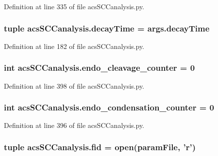 Definition at line 335 of file acs\-S\-C\-Canalysis.\-py.

\hypertarget{a00128_a29728f750a3b57770e836db8409767e9}{
\subsubsection[{decay\-Time}]{\setlength{\rightskip}{0pt plus 5cm}tuple acs\-S\-C\-Canalysis.\-decay\-Time = args.\-decay\-Time}}\label{a00128_a29728f750a3b57770e836db8409767e9}


Definition at line 182 of file acs\-S\-C\-Canalysis.\-py.

\hypertarget{a00128_af5702a39b502da88dde8c38417a0efbd}{
\subsubsection[{endo\-\_\-cleavage\-\_\-counter}]{\setlength{\rightskip}{0pt plus 5cm}int acs\-S\-C\-Canalysis.\-endo\-\_\-cleavage\-\_\-counter = 0}}\label{a00128_af5702a39b502da88dde8c38417a0efbd}


Definition at line 398 of file acs\-S\-C\-Canalysis.\-py.

\hypertarget{a00128_a20a51ec68106a5a97fb3a72f417ca4e6}{
\subsubsection[{endo\-\_\-condensation\-\_\-counter}]{\setlength{\rightskip}{0pt plus 5cm}int acs\-S\-C\-Canalysis.\-endo\-\_\-condensation\-\_\-counter = 0}}\label{a00128_a20a51ec68106a5a97fb3a72f417ca4e6}


Definition at line 396 of file acs\-S\-C\-Canalysis.\-py.

\hypertarget{a00128_a424e2204e89264a827e6cad861ebcbc1}{
\subsubsection[{fid}]{\setlength{\rightskip}{0pt plus 5cm}tuple acs\-S\-C\-Canalysis.\-fid = open({\bf param\-File}, '{\bf r}')}}\label{a00128_a424e2204e89264a827e6cad861ebcbc1}


